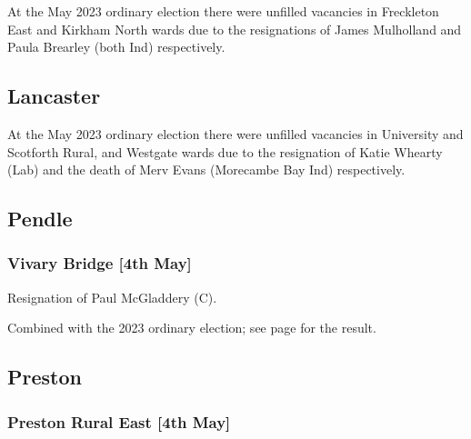 \documentclass[a4paper,openany]{book}
\begin{document}
\begin{resultsiii}
At the May 2023 ordinary election there were unfilled vacancies in Freckleton East and Kirkham North wards due to the resignations of James Mulholland and Paula Brearley (both Ind) respectively.%
%

\subsection*{Lancaster}

At the May 2023 ordinary election there were unfilled vacancies in University and Scotforth Rural, and Westgate wards due to the resignation of Katie Whearty (Lab) and the death of Merv Evans (Morecambe Bay Ind) respectively.%
%

\subsection*{Pendle}

\subsubsection*{Vivary Bridge \hspace*{\fill}\nolinebreak[1]%
	\enspace\hspace*{\fill}
	[4th May]}


Resignation of Paul McGladdery (C).

Combined with the 2023 ordinary election; see page \pageref{VivaryBridgePendle} for the result.

\subsection*{Preston}

\subsubsection*{Preston Rural East \hspace*{\fill}\nolinebreak[1]%
	\enspace\hspace*{\fill}
	[4th May]}



\end{resultsiii}
\end{document}
